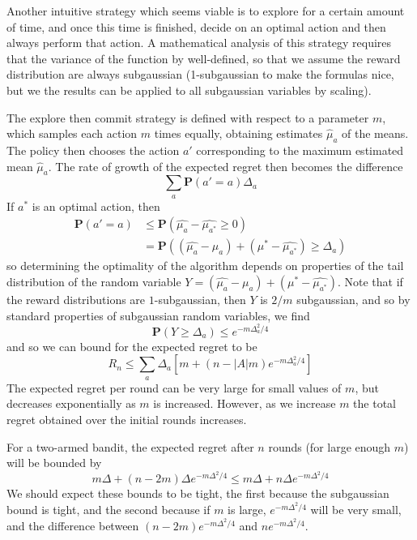 Another intuitive strategy which seems viable is to explore for a certain amount of time, and once this time is finished, decide on an optimal action and then always perform that action. A mathematical analysis of this strategy requires that the variance of the function by well-defined, so that we assume the reward distribution are always subgaussian (1-subgaussian to make the formulas nice, but we the results can be applied to all subgaussian variables by scaling).

The explore then commit strategy is defined with respect to a parameter $m$, which samples each action $m$ times equally, obtaining estimates $\widehat{\mu}_a$ of the means. The policy then chooses the action $a'$ corresponding to the maximum estimated mean $\widehat{\mu}_a$. The rate of growth of the expected regret then becomes the difference
%
\[ \sum_a \mathbf{P}(a' = a) \Delta_a \]
%
If $a^*$ is an optimal action, then
%
\begin{align*}
    \mathbf{P}(a' = a) &\leq \mathbf{P}(\widehat{\mu_a} - \widehat{\mu_{a^*}} \geq 0)\\
    &= \mathbf{P}((\widehat{\mu_a} - \mu_a) + (\mu^* - \widehat{\mu_{a^*}}) \geq \Delta_a)
\end{align*}
%
so determining the optimality of the algorithm depends on properties of the tail distribution of the random variable $Y = (\widehat{\mu_a} - \mu_a) + (\mu^* - \widehat{\mu_{a^*}})$. Note that if the reward distributions are $1$-subgaussian, then $Y$ is $2/m$ subgaussian, and so by standard properties of subgaussian random variables, we find
%
\[ \mathbf{P}(Y \geq \Delta_a) \leq e^{-m\Delta_a^2/4} \]
%
and so we can bound for the expected regret to be
%
\[ R_n \leq \sum_a \Delta_a \left[ m + (n - |A|m)e^{-m\Delta_a^2/4} \right] \]
%
The expected regret per round can be very large for small values of $m$, but decreases exponentially as $m$ is increased. However, as we increase $m$ the total regret obtained over the initial rounds increases.

For a two-armed bandit, the expected regret after $n$ rounds (for large enough $m$) will be bounded by
%
\[ m \Delta + (n - 2m) \Delta e^{-m \Delta^2/4} \leq m \Delta + n \Delta e^{-m \Delta^2/4} \]
%
We should expect these bounds to be tight, the first because the subgaussian bound is tight, and the second because if $m$ is large, $e^{-m \Delta^2/4}$ will be very small, and the difference between $(n - 2m) e^{-m \Delta^2/4}$ and $ne^{-m \Delta^2/4}$.

